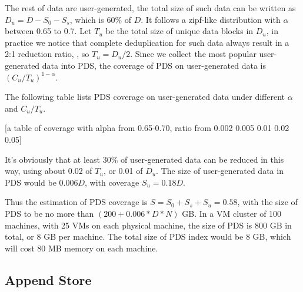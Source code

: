 The rest of data are user-generated, the total size of such data can be written as $D_u=D-S_0-S_s$, which is 60\% of $D$. 
It follows a zipf-like distribution with $\alpha$ between 0.65 to 0.7. 
Let $T_u$ be the total size of unique data blocks in $D_u$,
in practice we notice that complete deduplication for such data always result in a 2:1 reduction ratio,
, so $T_u=D_u/2$.
Since we collect the most popular user-generated data into PDS, the coverage of PDS on user-generated data
is $(C_u/T_u)^{1-\alpha}$.

The following table lists PDS coverage on user-generated data under different $\alpha$ and $C_u/T_u$.

[a table of coverage with alpha from 0.65-0.70, ratio from 0.002 0.005 0.01 0.02 0.05]

It's obviously that at least 30\% of user-generated data can be reduced in this way, using about 0.02 of $T_u$, or 0.01 of $D_u$.
The size of user-generated data in PDS would be 0.006$D$, with coverage $S_u=0.18D$.

Thus the estimation of PDS coverage is $S=S_0+S_s+S_u=0.58$, with the size of PDS to be no more than $(200 + 0.006*D*N)$ GB.
In a VM cluster of 100 machines, with 25 VMs on each physical machine, the size of PDS is 800 GB in total, or 8 GB per machine.
The total size of PDS index would be 8 GB, which will cost 80 MB memory on each machine. 

\subsection{Append Store}
